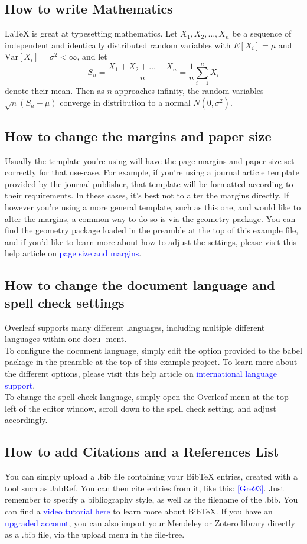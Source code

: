 \documentclass{article}
\begin{document}
\subsection{How to write Mathematics}
\LaTeX{} is great at typesetting mathematics. Let $X_1, X_2, \ldots, X_n$ be a sequence of independent and identically distributed random variables with $E[X_i] = \mu$ and $\text{Var}[X_i] = \sigma^2 < \infty$, and let
\[
S_n = \frac{X_1 + X_2 + \ldots + X_n}{n} =  \frac{1}{n} \sum_{i=1}^{n} X_i
\]
denote their mean. Then as $n$ approaches infinity, the random variables $\sqrt{n}(S_n - \mu)$ converge in distribution to a normal $N(0, \sigma^2)$.


\subsection{How to change the margins and paper size}
Usually the template you’re using will have the page margins and paper size set correctly for that
use-case. For example, if you’re using a journal article template provided by the journal publisher,
that template will be formatted according to their requirements. In these cases, it’s best not to alter
the margins directly.
If however you’re using a more general template, such as this one, and would like to alter the
margins, a common way to do so is via the geometry package. You can find the geometry package
loaded in the preamble at the top of this example file, and if you’d like to learn more about how to
adjust the settings, please visit this help article on \textcolor{blue}{page size and margins}.
\subsection{How to change the document language and spell check settings }
Overleaf supports many different languages, including multiple different languages within one docu-
ment.\\  
To configure the document language, simply edit the option provided to the babel package in the
preamble at the top of this example project. To learn more about the different options, please visit
this help article on
\textcolor{blue}{international language support}.\\  
To change the spell check language, simply open the Overleaf menu at the top left of the editor
window, scroll down to the spell check setting, and adjust accordingly.
\subsection{How to add Citations and a References List}
You can simply upload a .bib file containing your BibTeX entries, created with a tool such as JabRef.
You can then cite entries from it, like this:\textcolor{blue}{ [Gre93]}. Just remember to specify a bibliography style, as
well as the filename of the .bib. You can find a \textcolor{blue}{video tutorial here} to learn more about BibTeX.
If you have an \textcolor{blue}{upgraded account}, you can also import your Mendeley or Zotero library directly as
a .bib file, via the upload menu in the file-tree.
\end{document}
